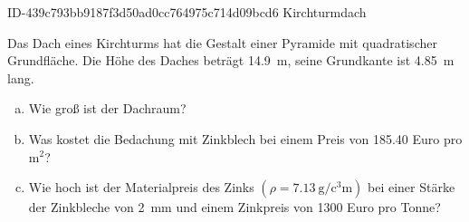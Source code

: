 \begin{exercise}
      {ID-439c793bb9187f3d50ad0cc764975c714d09bcd6}
      {Kirchturmdach}
  \ifproblem\problem\par
    Das Dach eines Kirchturms hat die Gestalt einer
    Pyramide mit quadratischer Grundfläche. Die Höhe
    des Daches beträgt \SI{14.9}{\metre}, seine
    Grundkante ist \SI{4.85}{\metre} lang.
    \begin{enumerate}[a)]
      \item Wie groß ist der Dachraum?
      \item Was kostet die Bedachung mit Zinkblech
            bei einem Preis von \num{185.40} Euro
            pro $\text{m}^2$?
      \item Wie hoch ist der Materialpreis des
            Zinks $(\rho=\SI{7.13}{\gram\per\cubic\centi\metre})$
            bei einer Stärke der Zinkbleche von
            \SI{2}{\milli\metre} und einem Zinkpreis
            von \num{1300} Euro pro Tonne?
    \end{enumerate}
  \fi
\end{exercise}
